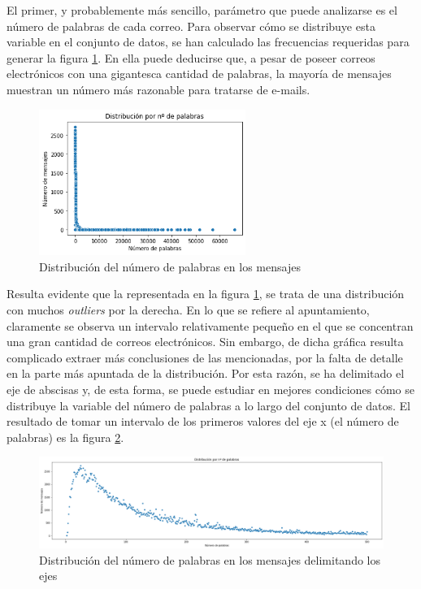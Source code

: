 El primer, y probablemente más sencillo, parámetro que puede analizarse es el número de palabras de cada correo. Para observar cómo se distribuye esta variable en el conjunto de datos, se han calculado las frecuencias requeridas para generar la figura \ref{fig:distpal}. En ella puede deducirse que, a pesar de poseer correos electrónicos con una gigantesca cantidad de palabras, la mayoría de mensajes muestran un número más razonable para tratarse de e-mails.

\begin{figure}[h]
	\centering%
	\centerline{\includegraphics[width = 0.6\textwidth]{Imagenes/Bitmap/dist-palabras.png}}%
	\caption{Distribución del número de palabras en los mensajes}%
	\label{fig:distpal}
\end{figure}

Resulta evidente que la representada en la figura \ref{fig:distpal}, se trata de una distribución con muchos \textit{outliers} por la derecha. En lo que se refiere al apuntamiento, claramente se observa un intervalo relativamente pequeño en el que se concentran una gran cantidad de correos electrónicos. Sin embargo, de dicha gráfica resulta complicado extraer más conclusiones de las mencionadas, por la falta de detalle en la parte más apuntada de la distribución. Por esta razón, se ha delimitado el eje de abscisas y, de esta forma, se puede estudiar en mejores condiciones cómo se distribuye la variable del número de palabras a lo largo del conjunto de datos. El resultado de tomar un intervalo de los primeros valores del eje x (el número de palabras) es la figura \ref{fig:distminpal}.

\begin{figure}[h]
	\centering%
	\centerline{\includegraphics[width = 1.3\textwidth]{Imagenes/Bitmap/dist-mini-palabras.png}}%
	\caption{Distribución del número de palabras en los mensajes delimitando los ejes}%
	\label{fig:distminpal}
\end{figure}

